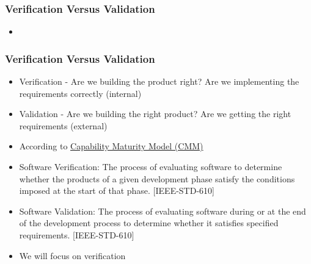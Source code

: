\documentclass[t,12pt,numbers,fleqn]{beamer}
\begin{document}

\begin{frame}
\frametitle{Verification Versus Validation}

\begin{itemize}

\item {}

\end{itemize}

\end{frame}


\begin{frame}
\frametitle{Verification Versus Validation}

\begin{itemize}

\item Verification - Are we building the product right?  Are we implementing the
  requirements correctly (internal)
\item Validation - Are we building the right product? Are we getting the right
  requirements (external)
\item According to
  \href{https://en.wikipedia.org/wiki/Software_verification_and_validation}{Capability
    Maturity Model (CMM)}
\bi
\item 
    Software Verification: The process of evaluating software to determine
    whether the products of a given development phase satisfy the conditions
    imposed at the start of that phase. [IEEE-STD-610]
  \item Software Validation: The process of evaluating software during or at the
    end of the development process to determine whether it satisfies specified
    requirements. [IEEE-STD-610] 
\ei
\item We will focus on verification
\end{itemize}

\end{frame}

\end{document}
